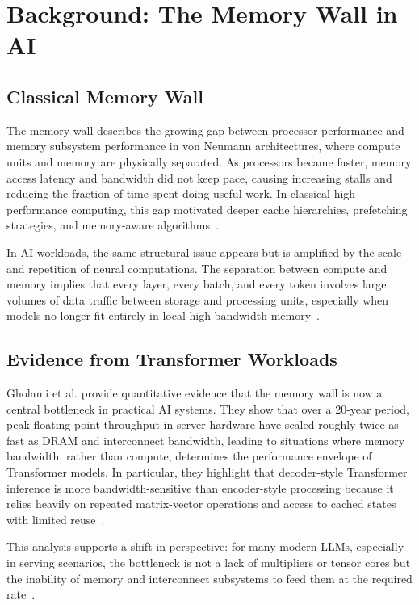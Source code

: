 \documentclass[conference]{IEEEtran}
\begin{document}
\section{Background: The Memory Wall in AI}
\label{sec:background}

\subsection{Classical Memory Wall}

The memory wall describes the growing gap between processor performance and memory subsystem performance in von Neumann architectures, where compute units and memory are physically separated. As processors became faster, memory access latency and bandwidth did not keep pace, causing increasing stalls and reducing the fraction of time spent doing useful work. In classical high-performance computing, this gap motivated deeper cache hierarchies, prefetching strategies, and memory-aware algorithms~\cite{roy2025breaking}.

In AI workloads, the same structural issue appears but is amplified by the scale and repetition of neural computations. The separation between compute and memory implies that every layer, every batch, and every token involves large volumes of data traffic between storage and processing units, especially when models no longer fit entirely in local high-bandwidth memory~\cite{bavikadi2020review,roy2025breaking}.

\subsection{Evidence from Transformer Workloads}

Gholami et al. provide quantitative evidence that the memory wall is now a central bottleneck in practical AI systems. They show that over a 20-year period, peak floating-point throughput in server hardware have scaled roughly twice as fast as DRAM and interconnect bandwidth, leading to situations where memory bandwidth, rather than compute, determines the performance envelope of Transformer models. In particular, they highlight that decoder-style Transformer inference is more bandwidth-sensitive than encoder-style processing because it relies heavily on repeated matrix-vector operations and access to cached states with limited reuse~\cite{gholami2024ai}.

This analysis supports a shift in perspective: for many modern LLMs, especially in serving scenarios, the bottleneck is not a lack of multipliers or tensor cores but the inability of memory and interconnect subsystems to feed them at the required rate~\cite{gholami2024ai}.
\end{document}

